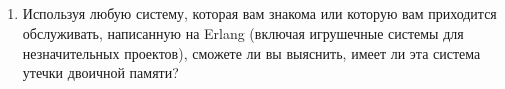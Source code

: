 \subsection*{\HandsOnTitle{}}

\begin{enumerate}
	\item Используя любую систему, которая вам знакома или которую вам приходится обслуживать, написанную на Erlang (включая игрушечные системы для незначительных проектов), сможете ли вы выяснить, имеет ли эта система утечки двоичной памяти?
\end{enumerate}
	

